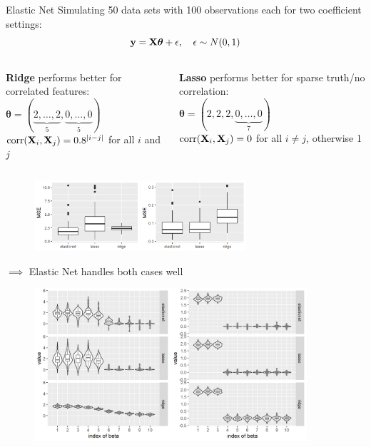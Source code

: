 \documentclass[11pt,compress,t,notes=noshow, xcolor=table]{beamer}
\begin{document}
\begin{vbframe} {Elastic Net }
\framebreak
\footnotesize
Simulating 50 data sets with 100 observations each for two coefficient settings: \\
\vspace{-0.3cm}
$$\mathbf{y} =\mathbf{X} \boldsymbol{\theta}+ \epsilon, \quad \epsilon \sim N(0,1)$$
\vspace{-0.3cm}
\begin{columns}
\begin{column}{0.5\textwidth}
\begin{center}
{\footnotesize \textbf{Ridge} performs better for correlated features}: \\ 
$\boldsymbol{\theta}=(\underbrace{2,\ldots,2}_{5},\underbrace{0,\ldots,0}_{5})$\\
$ \operatorname{corr}(\mathbf{X}_{i},\mathbf{X}_{j})=0.8^{|i-j|}$ for all $i$ and $j$
  \end{center}
\end{column}
\begin{column}{0.5\textwidth} 
\begin{center}
{\footnotesize \textbf{Lasso} performs better for sparse truth/no correlation:} \\
$\boldsymbol{\theta}=(2, 2, 2,\underbrace{0,\ldots,0}_{7})$ \\
$\operatorname{corr}(\mathbf{X}_{i},\mathbf{X}_{j})= 0$ for all $i \neq j$, otherwise 1
\end{center}
\end{column}
\end{columns}

\begin{figure}
\includegraphics[width=0.7\textwidth]{figure/enet_lasso_ridge_mse.png}\\
\end{figure}
{\normalsize $\implies$ Elastic Net handles both cases well}
\framebreak

\begin{figure}
\includegraphics[width=0.9\textwidth]{figure/enet_tradeoff.png}\\
\end{figure}



\end{vbframe}
\end{document}
